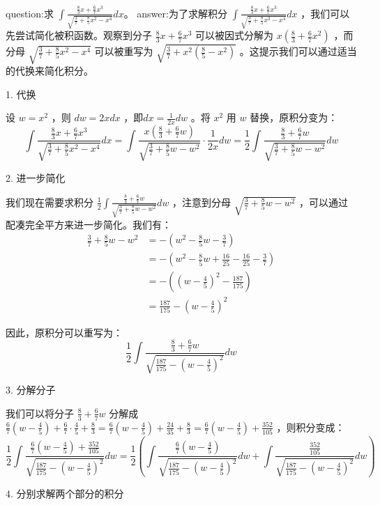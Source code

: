question:求 $\int \frac{\frac{8}{3}x+\frac{6}{7}x^3}{\sqrt{\frac{3}{7}+\frac{8}{5}x^2-x^4}} d x$。
answer:为了求解积分 $\int \frac{\frac{8}{3}x+\frac{6}{7}x^3}{\sqrt{\frac{3}{7}+\frac{8}{5}x^2-x^4}} d x$ ，我们可以先尝试简化被积函数。观察到分子 $\frac{8}{3}x+\frac{6}{7}x^3$ 可以被因式分解为 $x\left(\frac{8}{3}+\frac{6}{7}x^2\right)$ ，而分母 $\sqrt{\frac{3}{7}+\frac{8}{5}x^2-x^4}$ 可以被重写为 $\sqrt{\frac{3}{7}+x^2\left(\frac{8}{5}-x^2\right)}$ 。这提示我们可以通过适当的代换来简化积分。

1. 代换

设 $w=x^2$ ，则 $d w=2x d x$ ，即$d x=\frac{1}{2x} d w$ 。将 $x^2$ 用 $w$ 替换，原积分变为：
$$
\int \frac{\frac{8}{3}x+\frac{6}{7}x^3}{\sqrt{\frac{3}{7}+\frac{8}{5}x^2-x^4}} d x=\int \frac{x\left(\frac{8}{3}+\frac{6}{7}w\right)}{\sqrt{\frac{3}{7}+\frac{8}{5}w-w^2}}\cdot \frac{1}{2x} d w=\frac{1}{2}\int \frac{\frac{8}{3}+\frac{6}{7}w}{\sqrt{\frac{3}{7}+\frac{8}{5}w-w^2}} d w
$$

2. 进一步简化

我们现在需要求积分 $\frac{1}{2}\int \frac{\frac{8}{3}+\frac{6}{7}w}{\sqrt{\frac{3}{7}+\frac{8}{5}w-w^2}} d w$ ，注意到分母 $\sqrt{\frac{3}{7}+\frac{8}{5}w-w^2}$ ，可以通过配凑完全平方来进一步简化。我们有：
$$
\begin{aligned}
\frac{3}{7}+\frac{8}{5}w-w^2&=-\left(w^2-\frac{8}{5}w-\frac{3}{7}\right)\\
&=-\left(w^2-\frac{8}{5}w+\frac{16}{25}-\frac{16}{25}-\frac{3}{7}\right)\\
&=-\left(\left(w-\frac{4}{5}\right)^2-\frac{187}{175}\right)\\
&=\frac{187}{175}-\left(w-\frac{4}{5}\right)^2
\end{aligned}
$$

因此，原积分可以重写为：
$$
\frac{1}{2}\int \frac{\frac{8}{3}+\frac{6}{7}w}{\sqrt{\frac{187}{175}-(w-\frac{4}{5})^2}} d w
$$

3. 分解分子

我们可以将分子 $\frac{8}{3}+\frac{6}{7}w$ 分解成 $\frac{6}{7}(w-\frac{4}{5})+\frac{6}{7}\cdot \frac{4}{5}+\frac{8}{3}=\frac{6}{7}(w-\frac{4}{5})+\frac{24}{35}+\frac{8}{3}=\frac{6}{7}(w-\frac{4}{5})+\frac{352}{105}$ ，则积分变成：
$$
\frac{1}{2}\int \frac{\frac{6}{7}(w-\frac{4}{5})+\frac{352}{105}}{\sqrt{\frac{187}{175}-(w-\frac{4}{5})^2}} d w=\frac{1}{2}\left(\int \frac{\frac{6}{7}(w-\frac{4}{5})}{\sqrt{\frac{187}{175}-(w-\frac{4}{5})^2}} d w+\int \frac{\frac{352}{105}}{\sqrt{\frac{187}{175}-(w-\frac{4}{5})^2}} d w\right)
$$

4. 分别求解两个部分的积分

